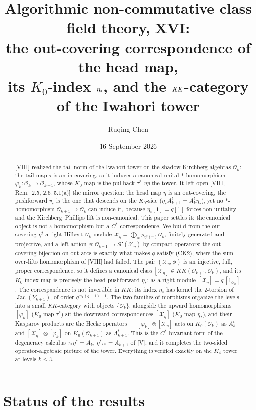 \documentclass[11pt]{amsart}
\title[Algorithmic non-commutative class field theory, XVI]
{Algorithmic non-commutative class field theory, XVI:\\
the out-covering correspondence of the head map,\\ its $K_0$-index $\et$, and the
$\KK$-category of the Iwahori tower}
\author{Ruqing Chen}
\date{16 September 2026}
\numberwithin{equation}{section}
\theoremstyle{definition}
\theoremstyle{remark}
\newcommand{\cO}{\mathcal{O}}
\newcommand{\cX}{\mathcal{X}}
\newcommand{\cK}{\mathcal{K}}
\newcommand{\KK}{\mathit{KK}}
\newcommand{\Jac}{\operatorname{Jac}}
\newcommand{\ta}{\tau_*}
\newcommand{\taup}{\tau^*}
\newcommand{\et}{\eta_*}
\newcommand{\etp}{\eta^*}
\begin{document}
\begin{abstract}
[VIII] realized the tail norm of the Iwahori tower on the shadow Kirchberg algebras
$\cO_k$: the tail map $\tau$ is an in-covering, so it induces a canonical unital
$*$-homomorphism $\varphi_k\colon\cO_k\to\cO_{k+1}$, whose $K_0$-map is the pullback
$\taup$ \emph{up} the tower. It left open [VIII, Rem.~2.5, 2.6, 5.1(a)] the mirror
question: the head map $\eta$ is an out-covering, the pushforward $\et$ is the one that
descends on the $K_0$-side ($\et A_{k+1}^{t}=A_k^{t}\et$), yet no $*$-homomorphism
$\cO_{k+1}\to\cO_k$ can induce it, because $\et[1]=q[1]$ forces non-unitality and the
Kirchberg--Phillips lift is non-canonical. This paper settles it: the canonical object
is not a homomorphism but a $C^*$-correspondence. We build from the out-covering
$\eta^{\sharp}$ a right Hilbert $\cO_k$-module
$\cX_\eta=\bigoplus_{w}p_{\eta^{\sharp}(w)}\cO_k$, finitely generated and projective, and
a left action $\phi\colon\cO_{k+1}\to\cK(\cX_\eta)$ by compact operators; the out-covering
bijection on out-arcs is exactly what makes $\phi$ satisfy (CK2), where the sum-over-lifts
homomorphism of [VIII] had failed. The pair $(\cX_\eta,\phi)$ is an injective, full,
proper correspondence, so it defines a canonical class
$[\cX_\eta]\in\KK(\cO_{k+1},\cO_k)$, and its $K_0$-index map is precisely the head
pushforward $\et$; as a right module $[\cX_\eta]=q\,[1_{\cO_k}]$. The correspondence is
not invertible in $\KK$: its index $\et$ has kernel the $2$-torsion of $\Jac(Y_{k+1})$,
of order $q^{\,n_k(q-1)-1}$. The two families of morphisms organize the levels into a
small $\KK$-category with objects $\{\cO_k\}$: alongside the upward homomorphisms
$[\varphi_k]$ ($K_0$-map $\taup$) sit the downward correspondences $[\cX_\eta]$ ($K_0$-map
$\et$), and their Kasparov products are the Hecke operators ---
$[\varphi_k]\otimes[\cX_\eta]$ acts on $K_0(\cO_k)$ as $A_k^{t}$ and
$[\cX_\eta]\otimes[\varphi_k]$ on $K_0(\cO_{k+1})$ as $A_{k+1}^{t}$. This is the
$C^*$-bivariant form of the degeneracy calculus $\ta\etp=A_k$, $\etp\ta=A_{k+1}$ of [V],
and it completes the two-sided operator-algebraic picture of the tower. Everything is
verified exactly on the $K_4$ tower at levels $k\le3$.
\end{abstract}

\maketitle

\section*{Status of the results}
\end{document}
